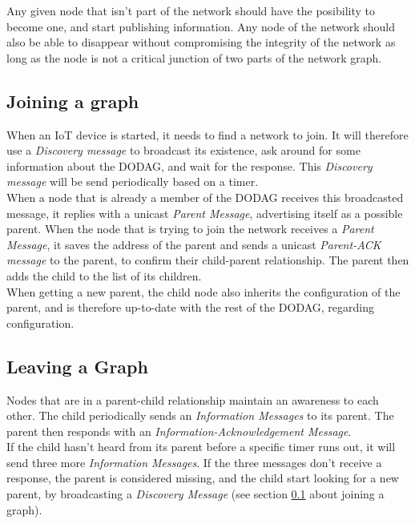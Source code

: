 \documentclass[a4paper,11pt]{article}
\begin{document}
Any given node that isn't part of the network should have the posibility to become one, and start publishing information. Any node of the network should also be able to disappear without compromising the integrity of the network as long as the node is not a critical junction of two parts of the network graph.

\subsection{Joining a graph}
\label{sec: joining-graph}
When an IoT device is started, it needs to find a network to join. It will therefore use a \textit{Discovery message} to broadcast its existence, ask around for some information about the DODAG, and wait for the response. This \textit{Discovery message} will be send periodically based on a timer.\\

When a node that is already a member of the DODAG receives this broadcasted message, it replies with a unicast \textit{Parent Message}, advertising itself as a possible parent. When the node that is trying to join the network receives a \textit{Parent Message}, it saves the address of the parent and sends a unicast \textit{Parent-ACK message} to the parent, to confirm their child-parent relationship. The parent then adds the child to the list of its children.\\

When getting a new parent, the child node also inherits the configuration of the parent, and is therefore up-to-date with the rest of the DODAG, regarding configuration.

\subsection{Leaving a Graph}
Nodes that are in a parent-child relationship maintain an awareness to each other. The child periodically sends an \textit{Information Messages} to its parent. The parent then responds with an \textit{Information-Acknowledgement Message}.\\

If the child hasn't heard from its parent before a specific timer runs out, it will send three more \textit{Information Messages}. If the three messages don't receive a response, the parent is considered missing, and the child start looking for a new parent, by broadcasting a \textit{Discovery Message} (see section \ref{sec: joining-graph} about joining a graph).
\end{document}

